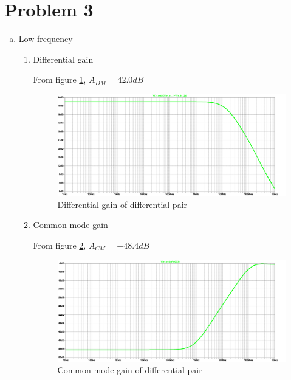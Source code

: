 \documentclass{article}
\begin{document}
\section{Problem 3}
\label{sec:org8c35992}
\begin{enumerate}[(a)]
\item Low frequency
\begin{enumerate}[1.]
\item Differential gain

From figure \ref{fig:dm-q3}, \(A_{DM} = 42.0 dB\)
\begin{figure}[H]
\centering
\includegraphics[width=.9\linewidth]{img/q3/dm.pdf}
\caption{\label{fig:dm-q3}Differential gain of differential pair}
\end{figure}

\item Common mode gain

From figure \ref{fig:cm-q3}, \(A_{CM} = -48.4 dB\)
\begin{figure}[H]
\centering
\includegraphics[width=.9\linewidth]{img/q3/cm.pdf}
\caption{\label{fig:cm-q3}Common mode gain of differential pair}
\end{figure}
\end{enumerate}
\end{enumerate}
\end{document}
